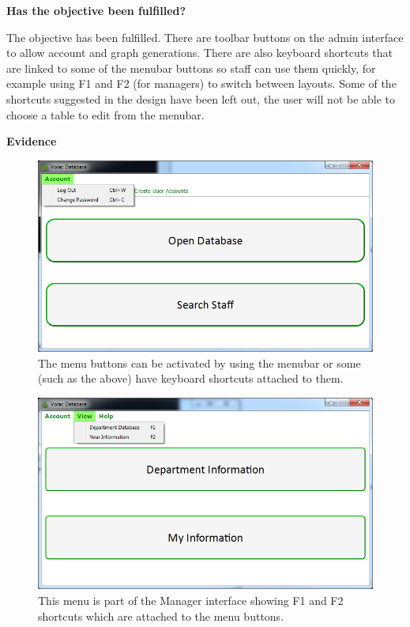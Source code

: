 \textbf{Has the objective been fulfilled?}

The objective has been fulfilled. There are toolbar buttons on the admin interface to allow account and graph generations. There are also keyboard shortcuts that are linked to some of the menubar buttons so staff can use them quickly, for example using F1 and F2 (for managers) to switch between layouts. Some of the shortcuts suggested in the design have been left out, the user will not be able to choose a table to edit from the menubar. 

\textbf{Evidence}

\begin{figure}[H]
    \includegraphics[width=\textwidth]{./Evaluation/Images/shortcuts1.png}
    \caption{The menu buttons can be activated by using the menubar or some (such as the above) have keyboard shortcuts attached to them.} 
\end{figure}

\begin{figure}[H]
    \includegraphics[width=\textwidth]{./Evaluation/Images/shortcuts2.png}
    \caption{This menu is part of the Manager interface showing F1 and F2 shortcuts which are attached to the menu buttons.} 
\end{figure}


